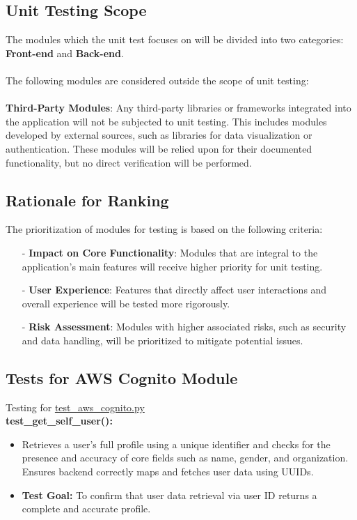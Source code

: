 \documentclass[12pt, titlepage]{article}
\begin{document}
\begin{enumerate}
\begin{enumerate}
\begin{enumerate}
\begin{enumerate}
\subsection{Unit Testing Scope}
The modules which the unit test focuses on will be divided into two categories: \textbf{Front-end} and \textbf{Back-end}.\\\\
The following modules are considered outside the scope of unit testing:\\\\
\textbf{Third-Party Modules}: 
Any third-party libraries or frameworks integrated into the application will not be subjected to unit testing. This includes modules developed by external sources, such as libraries for data visualization or authentication. These modules will be relied upon for their documented functionality, but no direct verification will be performed.


\subsection{Rationale for Ranking}
The prioritization of modules for testing is based on the following criteria:
\begin{itemize}
    \item[-] \textbf{Impact on Core Functionality}: Modules that are integral to the application’s main features will receive higher priority for unit testing.
    \item[-] \textbf{User Experience}: Features that directly affect user interactions and overall experience will be tested more rigorously.
    \item[-] \textbf{Risk Assessment}: Modules with higher associated risks, such as security and data handling, will be prioritized to mitigate potential issues.
\end{itemize}

\subsection{Tests for AWS Cognito Module}
Testing for \href{https://github.com/RezaJodeiri/CXR-Capstone/blob/main/src/backend/test/test_aws_conito.py}{test\_aws\_cognito.py} \\

\textbf{test\_get\_self\_user():}  
\begin{itemize}
    \item Retrieves a user's full profile using a unique identifier and checks for the presence and accuracy of core fields such as name, gender, and organization. Ensures backend correctly maps and fetches user data using UUIDs.
    \item \textbf{Test Goal:} To confirm that user data retrieval via user ID returns a complete and accurate profile. 
    \newline
\end{itemize}


\end{enumerate}
\end{enumerate}
\end{enumerate}
\end{enumerate}
\end{document}
